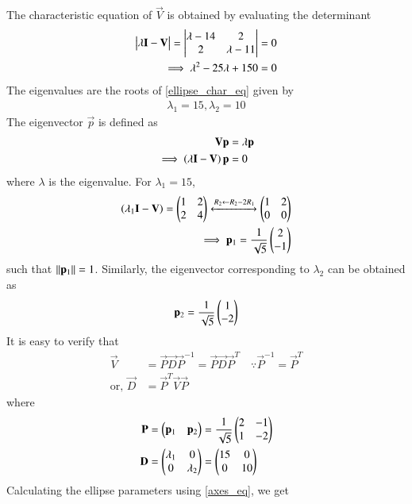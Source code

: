 \documentclass[journal,12pt,twocolumn]{IEEEtran}
\begin{document}
The characteristic equation of $\vec{V}$ is obtained by evaluating the determinant
\begin{align}
\begin{vmatrix}\lambda \mathbf{I}-\mathbf{V}\end{vmatrix} = \begin{vmatrix}\lambda -14 & 2 \\ 2 & \lambda -11\end{vmatrix} &= 0
\\
\implies \lambda^2 - 25\lambda + 150 &= 0
\label{ellipse_char_eq}
\end{align}
The eigenvalues are the roots of \eqref{ellipse_char_eq} given by
\begin{align}
\lambda_1 = 15, \lambda_2 = 10
\label{ellipse_eval_eq}
\end{align}
The eigenvector $\vec{p}$ is defined as
\begin{align}
\mathbf{V} \mathbf{p}&= \lambda \mathbf{p}
\\
\implies \left(\lambda\mathbf{I}-\mathbf{V}\right)\mathbf{p} &=0
\end{align}
where $\lambda$ is the eigenvalue.  For $\lambda_1 = 15$,
\begin{align}
\left(\lambda_1\mathbf{I}-\mathbf{V}\right)
= \begin{pmatrix}1 & 2 \\ 2 & 4\end{pmatrix} 
\xleftrightarrow{R_2\leftarrow R_2-2R_1}\begin{pmatrix}1 & 2 \\0 & 0 \end{pmatrix}  
\\
\implies \mathbf{p}_1 = \frac{1}{\sqrt{5}}\begin{pmatrix}2 \\ -1\end{pmatrix}
\end{align}
such that $\left\lVert\mathbf{p}_1\right\rVert = 1$.  Similarly, the eigenvector corresponding to $\lambda_2$ can be obtained as
\begin{align}
 \mathbf{p}_2 = \frac{1}{\sqrt{5}}\begin{pmatrix}1 \\ -2\end{pmatrix}
\end{align}
It is easy to verify that 
\begin{align}
\vec{V} &= \vec{P}\vec{D}\vec{P}^{-1}=\vec{P}\vec{D}\vec{P}^T \quad \because \vec{P}^{-1} = \vec{P}^{T} \label{ellipse_spectrum_eq}
\\
\text{or, } \vec{D} &= \vec{P}^T\vec{V}\vec{P}
\end{align}
where 
\begin{align}
\mathbf{P} & =\begin{pmatrix}\mathbf{p}_1 & \mathbf{p}_2\end{pmatrix} = \frac{1}{\sqrt{5}}\begin{pmatrix}2 & -1\\ 1 & -2\end{pmatrix} \label{ellipse_spectrum_P_eq}
\\
 \mathbf{D} &= \begin{pmatrix}\lambda_1 & 0 \\ 0 & \lambda_2\end{pmatrix} =\begin{pmatrix}15 & 0\\ 0 & 10\end{pmatrix}
\label{eq:ellipse_spectrum_D}
\end{align}
Calculating the ellipse parameters using \eqref{axes_eq}, we get
\end{document}
